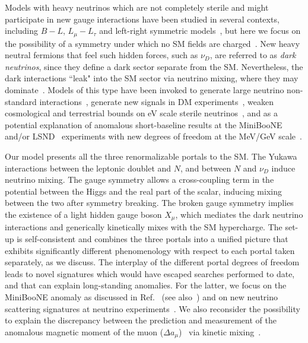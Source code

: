 Models with heavy neutrinos which are not completely sterile and might participate in new gauge interactions have been studied in several contexts, including $B-L$, $L_\mu-L_\tau$ and left-right symmetric models~\cite{%
Buchmuller:1991ce,%
Khalil:2006yi,%
Perez:2009mu,%
Khalil:2010iu,%
Dib:2014fua,%
Baek:2015mna,%
DeRomeri:2017oxa,%
Nomura:2018mwr,%
Brdar:2018sbk%
}, but here we focus on the possibility of a symmetry under which no SM fields are charged~\cite{%
Okada:2014nsa,%
Diaz:2017edh,%
Nomura:2018ibs%
}. New heavy neutral fermions that feel such hidden forces, such as $\nu_D$, are referred to as \textit{dark neutrinos}, since they define a dark sector separate from the SM. Nevertheless, the dark interactions ``leak" into the SM sector via neutrino mixing, where they may dominate~\cite{Pospelov:2011ha,Batell:2016zod}. Models of this type have been invoked to generate large neutrino non-standard interactions~\cite{Farzan:2015doa,Farzan:2016wym}, generate new signals in DM experiments~\cite{Pospelov:2011ha,Pospelov:2012gm,*Pospelov:2013rha,Harnik:2012ni,McKeen:2018pbb}, weaken cosmological and terrestrial bounds on eV scale sterile neutrinos~\cite{Hannestad:2013ana,*Dasgupta:2013zpn,*Mirizzi:2014ama,*Chu:2015ipa,*Cherry:2016jol,*Chu:2018gxk,Denton:2018dqq,*Esmaili:2018qzu}, and as a potential explanation of anomalous short-baseline results at the MiniBooNE~\cite{AguilarArevalo:2007it,*Aguilar-Arevalo:2018gpe} and/or LSND~\cite{PhysRevLett.77.3082,*Aguilar:2001ty} experiments with new degrees of freedom at the MeV/GeV scale~\cite{Gninenko:2009ks,Gninenko:2010pr,Masip:2012ke,Radionov:2013mca,Ballett:2018ynz,Bertuzzo:2018itn,Arguelles:2018mtc}.

Our model presents all the three renormalizable portals to the SM. The Yukawa interactions between the leptonic doublet and $N$, and between $N$ and $\nu_D$ induce neutrino mixing. 
The gauge symmetry allows a cross-coupling term in the potential between the Higgs and the real part of the scalar, inducing mixing between the two after symmetry breaking. The broken gauge symmetry implies the existence of a light hidden gauge boson $X_\mu$, which mediates the dark neutrino interactions and generically kinetically mixes with the SM hypercharge. The set-up is self-consistent and combines the three portals into a unified picture that exhibits significantly different phenomenology with respect to each portal taken separately, as we discuss. The interplay of the different portal degrees of freedom leads to novel signatures which would have escaped searches performed to date, and that can explain long-standing anomalies. For the latter, we focus on the MiniBooNE anomaly as discussed in Ref.~\cite{Ballett:2018ynz} (see also~\cite{Bertuzzo:2018itn}) and on new neutrino scattering signatures at neutrino experiments~\cite{Arguelles:2018mtc}. We also reconsider the possibility to explain the discrepancy between the prediction and measurement of the anomalous magnetic moment of the muon ($\Delta a_\mu$)~\cite{Bennett:2006fi} via kinetic mixing~\cite{Fayet:2007ua,*Pospelov:2008zw}.

